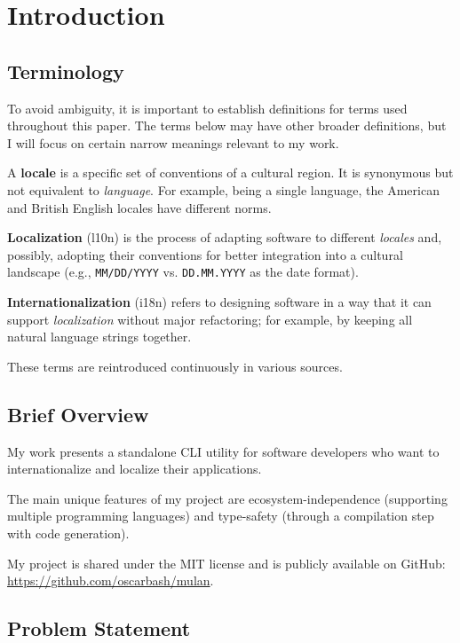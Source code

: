 \chapter{Introduction}

\section{Terminology}

To avoid ambiguity, it is important to establish definitions for
terms used throughout this paper. The terms below may have other
broader definitions, but I will focus on certain narrow meanings
relevant to my work.

A \textbf{locale} is a specific set of conventions of a cultural region.
It is synonymous but not equivalent to \textit{language}.
For example, being a single language, the American and British English
locales have different norms.

\textbf{Localization} (l10n) is the process of adapting software
to different \textit{locales} and, possibly, adopting their
conventions for better integration into a cultural landscape
(e.g., \texttt{MM/DD/YYYY} vs. \texttt{DD.MM.YYYY} as the date format).

\textbf{Internationalization} (i18n) refers to designing software
in a way that it can support \textit{localization} without major
refactoring; for example, by keeping all natural language strings together.

These terms are reintroduced continuously in various sources.
\cite{barbour1997, he2002, couto2026}

\section{Brief Overview}

My work presents a standalone CLI utility for software developers
who want to internationalize and localize their applications.

The main unique features of my project are ecosystem-independence
(supporting multiple programming languages) and type-safety (through
a compilation step with code generation).

My project is shared under the MIT license and is publicly available
on GitHub: \url{https://github.com/oscarbash/mulan}.

\section{Problem Statement}

